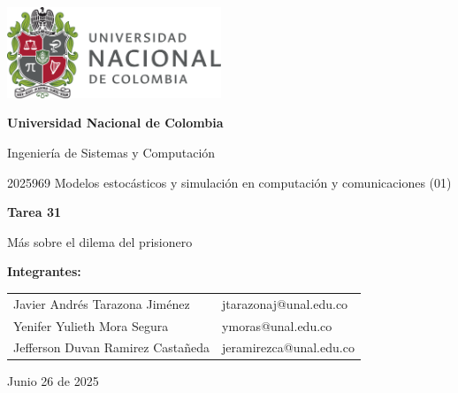 \documentclass{article}
\begin{document}
\begin{titlepage}
    \centering
    \includegraphics[width=0.48\textwidth]{logo_universidad.png}
    \par\vspace{2cm}

    {\Large \textbf{Universidad Nacional de Colombia} \par}
    \vspace{0.5cm}
    {\large Ingeniería de Sistemas y Computación \par}
    {\large 2025969 Modelos estocásticos y simulación en computación y comunicaciones (01)\par}
    \vspace{3cm}

    {\large \textbf{Tarea 31} \par}
    {\large Más sobre el dilema del prisionero\par}
    \vspace{3cm}

    {\large \textbf{Integrantes:} \par}
    \vspace{0.5cm}
    \begin{tabular}{ll}
    Javier Andrés Tarazona Jiménez & jtarazonaj@unal.edu.co \\
    Yenifer Yulieth Mora Segura & ymoras@unal.edu.co \\
    Jefferson Duvan Ramirez Castañeda & jeramirezca@unal.edu.co \\
    \end{tabular}
    \par\vspace{3cm}

    {\large Junio 26 de 2025 \par}
\end{titlepage}

\tableofcontents %

\newpage %
\end{document}
